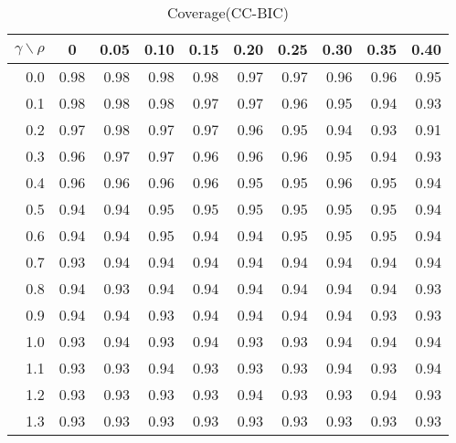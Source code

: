 \documentclass[12pt]{article}
\begin{document}
%
\begin{table}[!tbp]
\caption{Coverage(CC-BIC)}
 \begin{center}
 \begin{tabular}{r|rrrrrrrrr}\hline\hline
\multicolumn{1}{c|}{$\gamma\backslash\rho$}&\multicolumn{1}{c}{0}&\multicolumn{1}{c}{0.05}&\multicolumn{1}{c}{0.10}&\multicolumn{1}{c}{0.15}&\multicolumn{1}{c}{0.20}&\multicolumn{1}{c}{0.25}&\multicolumn{1}{c}{0.30}&\multicolumn{1}{c}{0.35}&\multicolumn{1}{c}{0.40}\tabularnewline
\hline
0.0&0.98&0.98&0.98&0.98&0.97&0.97&0.96&0.96&0.95\tabularnewline
0.1&0.98&0.98&0.98&0.97&0.97&0.96&0.95&0.94&0.93\tabularnewline
0.2&0.97&0.98&0.97&0.97&0.96&0.95&0.94&0.93&0.91\tabularnewline
0.3&0.96&0.97&0.97&0.96&0.96&0.96&0.95&0.94&0.93\tabularnewline
0.4&0.96&0.96&0.96&0.96&0.95&0.95&0.96&0.95&0.94\tabularnewline
0.5&0.94&0.94&0.95&0.95&0.95&0.95&0.95&0.95&0.94\tabularnewline
0.6&0.94&0.94&0.95&0.94&0.94&0.95&0.95&0.95&0.94\tabularnewline
0.7&0.93&0.94&0.94&0.94&0.94&0.94&0.94&0.94&0.94\tabularnewline
0.8&0.94&0.93&0.94&0.94&0.94&0.94&0.94&0.94&0.93\tabularnewline
0.9&0.94&0.94&0.93&0.94&0.94&0.94&0.94&0.93&0.93\tabularnewline
1.0&0.93&0.94&0.93&0.94&0.93&0.93&0.94&0.94&0.94\tabularnewline
1.1&0.93&0.93&0.94&0.93&0.93&0.93&0.94&0.93&0.94\tabularnewline
1.2&0.93&0.93&0.93&0.93&0.94&0.93&0.93&0.94&0.93\tabularnewline
1.3&0.93&0.93&0.93&0.93&0.93&0.93&0.93&0.93&0.93\tabularnewline
\hline
\end{tabular}

\end{center}

\end{table}
\end{document}

